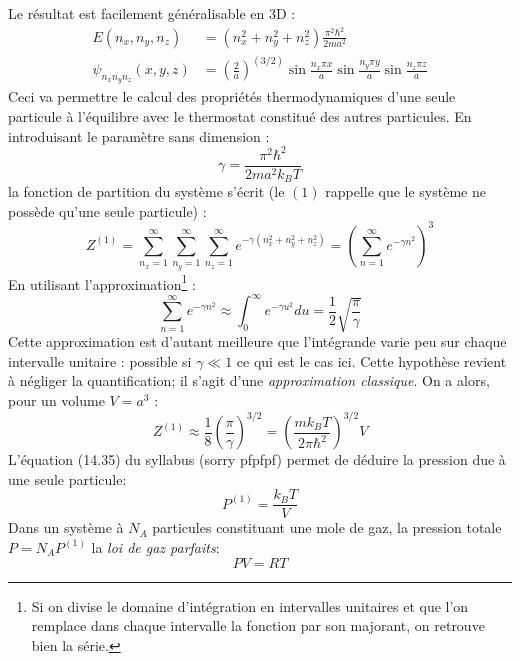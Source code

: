 \documentclass	[11pt, a4paper, openany]{book}
\begin{document}
Le résultat est facilement généralisable en 3D :
\begin{equation}
\begin{array}{ll}
E(n_x,n_y,n_z) &= (n_x^2 +n_y^2+n_z^2)\frac{\pi^2\hbar^2}{2ma^2}\\
\psi_{n_xn_yn_z}(x,y,z) &= (\frac{2}{a})^(3/2)\sin\frac{n_x\pi x}{a}\sin\frac{n_y\pi y}{a}\sin\frac{n_z\pi z}{a}
\end{array} 
\end{equation}
Ceci va permettre le calcul des propriétés thermodynamiques d'une seule particule à l'équilibre avec
le thermostat constitué des autres particules. En introduisant le paramètre sans dimension :
\begin{equation}
\gamma = \dfrac{\pi^2\hbar^2}{2ma^2k_BT}
\end{equation} 
la fonction de partition du système s'écrit (le $(1)$ rappelle que le système ne possède qu'une
seule particule) :
\begin{equation}
Z^{(1)} = \sum_{n_x=1}^\infty\sum_{n_y=1}^\infty\sum_{n_z=1}^\infty e^{-\gamma(n_x^2 +n_y^2+n_z^2)}
 = \left(\sum_{n=1}^\infty e^{-\gamma n^2}\right)^3
\end{equation}
En utilisant l'approximation\footnote{Si on divise le domaine d'intégration en intervalles unitaires et
que l'on remplace dans chaque intervalle la fonction par son majorant, on retrouve bien la série.} :
\begin{equation}
\sum_{n=1}^\infty e^{-\gamma n^2} \approx \int_0^\infty e^{-\gamma u^2}du = \dfrac{1}{2}\sqrt{\dfrac{\pi}
{\gamma}}
\label{eq:ApproxSerie}
\end{equation}
Cette approximation est d'autant meilleure que l’intégrande varie peu sur chaque intervalle unitaire :
possible si $\gamma \ll 1$ ce qui est le cas ici. Cette hypothèse revient à négliger la quantification;
il s'agit d'une \textit{approximation classique}. On a alors, pour un volume $V=a^3$ :
\begin{equation}
Z^{(1)} \approx \dfrac{1}{8}\left(\dfrac{\pi}{\gamma}\right)^{3/2} = \left(\dfrac{mk_BT}{2\pi\hbar^2}
\right)^{3/2}V
\label{eq:z1}
\end{equation}
L'équation (14.35) du syllabus (sorry pfpfpf) permet de déduire la pression due à une seule particule:
\begin{equation}
P^{(1)} = \dfrac{k_BT}{V}
\end{equation}
Dans un système à  $N_A$ particules constituant une mole de gaz, la pression totale $P = N_AP^{(1)}$ la
\textit{loi de gaz parfaits}:
\begin{equation}
PV = RT
\end{equation}
\end{document}
